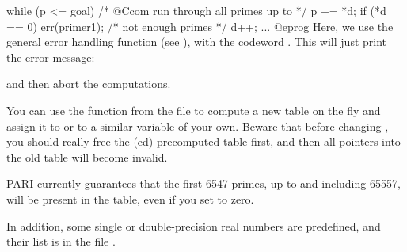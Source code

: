 while (p <= goal) /* @Ccom run through all primes up to  */
{
  p += *d;
  if (*d == 0) err(primer1); /* {\rm not enough primes} */
  d++;
  ...
}
@eprog\noindent
Here, we use the general error handling function  (see
), with the codeword . This will just print
the error message:


\noindent and then abort the computations.

You can use the function  from the file  to
compute a new table on the fly and assign it to  or to a
similar variable of your own. Beware that before changing ,
you should really free the (ed) precomputed table first, and then
all pointers into the old table will become invalid.

PARI currently guarantees that the first 6547 primes, up to and including
65557, will be present in the table, even if you set  to zero.

In addition, some single or double-precision real numbers are predefined,
and their list is in the file .
\vfill\eject

